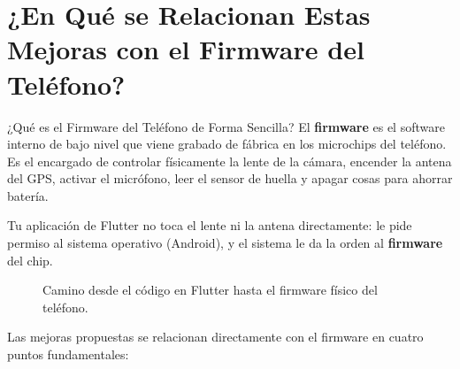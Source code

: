 \documentclass[11pt,a4paper]{article}
\begin{document}
\newpage
\section{¿En Qué se Relacionan Estas Mejoras con el Firmware del Teléfono?}

\begin{conceptbox}{¿Qué es el Firmware del Teléfono de Forma Sencilla?}
El \textbf{firmware} es el software interno de bajo nivel que viene grabado de fábrica en los microchips del teléfono. Es el encargado de controlar físicamente la lente de la cámara, encender la antena del GPS, activar el micrófono, leer el sensor de huella y apagar cosas para ahorrar batería. 

Tu aplicación de Flutter no toca el lente ni la antena directamente: le pide permiso al sistema operativo (Android), y el sistema le da la orden al \textbf{firmware} del chip.
\end{conceptbox}

\vspace{0.3cm}

\begin{figure}[h!]
\centering
{}
\caption{Camino desde el código en Flutter hasta el firmware físico del teléfono.}
\end{figure}

Las mejoras propuestas se relacionan directamente con el firmware en cuatro puntos fundamentales:
\end{document}
